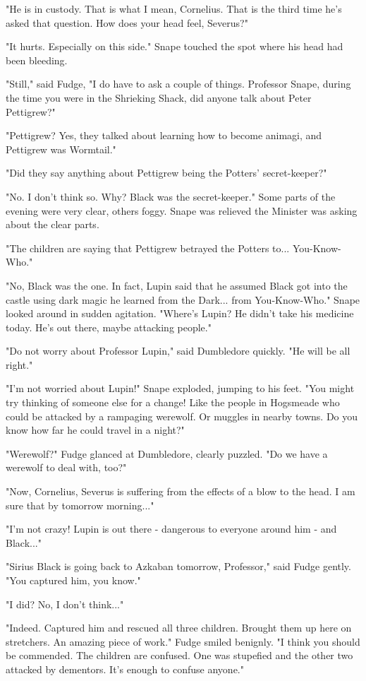 "He is in custody. That is what I mean, Cornelius. That is the third time he's asked that question. How does your head feel, Severus?"

"It hurts. Especially on this side." Snape touched the spot where his head had been bleeding.

"Still," said Fudge, "I do have to ask a couple of things. Professor Snape, during the time you were in the Shrieking Shack, did anyone talk about Peter Pettigrew?"

"Pettigrew? Yes, they talked about learning how to become animagi, and Pettigrew was Wormtail."

"Did they say anything about Pettigrew being the Potters' secret-keeper?"

"No. I don't think so. Why? Black was the secret-keeper." Some parts of the evening were very clear, others foggy. Snape was relieved the Minister was asking about the clear parts.

"The children are saying that Pettigrew betrayed the Potters to... You-Know-Who."

"No, Black was the one. In fact, Lupin said that he assumed Black got into the castle using dark magic he learned from the Dark... from You-Know-Who." Snape looked around in sudden agitation. "Where's Lupin? He didn't take his medicine today. He's out there, maybe attacking people."

"Do not worry about Professor Lupin," said Dumbledore quickly. "He will be all right."

"I'm not worried about Lupin!" Snape exploded, jumping to his feet. "You might try thinking of someone else for a change! Like the people in Hogsmeade who could be attacked by a rampaging werewolf. Or muggles in nearby towns. Do you know how far he could travel in a night?"

"Werewolf?" Fudge glanced at Dumbledore, clearly puzzled. "Do we have a werewolf to deal with, too?"

"Now, Cornelius, Severus is suffering from the effects of a blow to the head. I am sure that by tomorrow morning..."

"I'm not crazy! Lupin is out there - dangerous to everyone around him - and Black..."

"Sirius Black is going back to Azkaban tomorrow, Professor," said Fudge gently. "You captured him, you know."

"I did? No, I don't think..."

"Indeed. Captured him and rescued all three children. Brought them up here on stretchers. An amazing piece of work." Fudge smiled benignly. "I think you should be commended. The children are confused. One was stupefied and the other two attacked by dementors. It's enough to confuse anyone."

